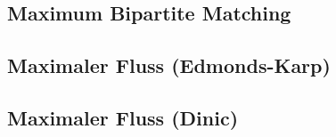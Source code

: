 %


%



%


%

%

\subsection{Maximum Bipartite Matching}


\subsection{Maximaler Fluss (Edmonds-Karp)}


\subsection{Maximaler Fluss (Dinic)}


